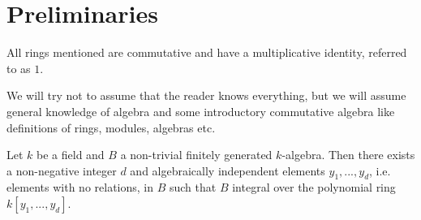 

\section{Preliminaries}
All rings mentioned are commutative and have a multiplicative identity, 
referred to as $1$. 

We will try not to assume that the reader knows everything, 
but we will assume general knowledge of algebra and some introductory commutative algebra like definitions of rings, 
modules, algebras etc. 

\begin{theorem}
Let $k$ be a field and $B$ a non-trivial finitely generated $k$-algebra. 
Then there exists a non-negative integer $d$ and algebraically independent elements $y_1, ..., y_d$, 
i.e. elements with no relations, 
in $B$ such that $B$ integral over the polynomial ring $k[y_1, ..., y_d]$.
\end{theorem}
